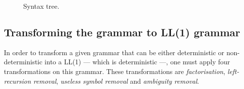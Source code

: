 \documentclass[a4paper,11pt]{article}
\begin{document}
  \begin{figure}[h!]
    \centering
  \caption{Syntax tree.}
    \label{fig:syntaxtreeintroduction}
  \end{figure}
  
  \subsection{Transforming the grammar to LL(1) grammar}
    \label{grammartoll1methods}
    In order to transform a given grammar that can be either deterministic or non-deterministic into a LL(1) --- which is deterministic ---, one must apply four transformations on this grammar. These transformations are \textit{factorisation}, \textit{left-recursion removal}, \textit{useless symbol removal} and \textit{ambiguity removal}.
    
\end{document}
